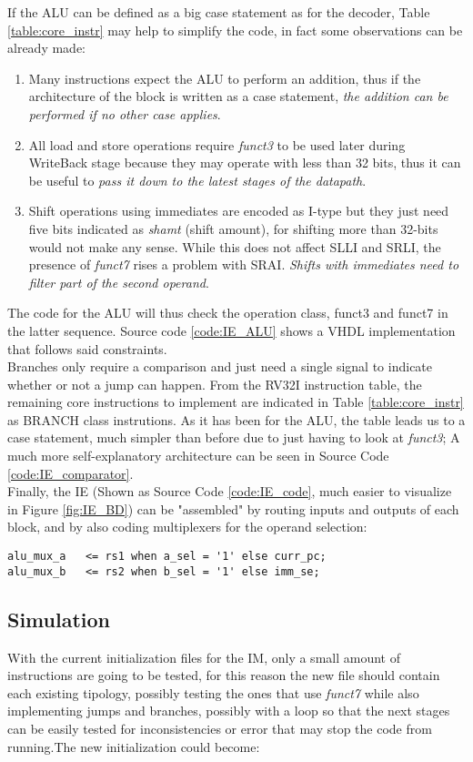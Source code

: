 If the ALU can be defined as a big case statement as for the decoder, Table \ref{table:core_instr} may help to simplify the code, in fact some observations can be already made:
\begin{enumerate}
\item Many instructions expect the ALU to perform an addition, thus if the architecture of the block is written as a case statement, \emph{the addition can be performed if no other case applies}.
\item All load and store operations require \emph{funct3} to be used later during WriteBack stage because they may operate with less than 32 bits, thus it can be useful to \emph{pass it down to the latest stages of the datapath}.
\item Shift operations using immediates are encoded as I-type but they just need five bits indicated as \emph{shamt} (shift amount), for shifting more than 32-bits would not make any sense. While this does not affect SLLI and SRLI, the presence of \emph{funct7} rises a problem with SRAI. \emph{Shifts with immediates need to filter part of the second operand}.
\end{enumerate}
The code for the ALU will thus check the operation class, funct3 and funct7 in the latter sequence. Source code \ref{code:IE_ALU} shows a VHDL implementation that follows said constraints.\\
Branches only require a comparison and just need a single signal to indicate whether or not a jump can happen. From the RV32I instruction table, the remaining core instructions  to implement are indicated in Table \ref{table:core_instr} as BRANCH class instrutions. As it has been for the ALU, the table leads us to a case statement, much simpler than before due to just having to look at \emph{funct3}; A much more self-explanatory architecture can be seen in Source Code \ref{code:IE_comparator}.\\
Finally, the IE (Shown as Source Code \ref{code:IE_code}, much easier to visualize in Figure \ref{fig:IE_BD}) can be "assembled" by routing inputs and outputs of each block, and by also coding multiplexers for the operand selection:

\begin{verbatim}
alu_mux_a   <= rs1 when a_sel = '1' else curr_pc;
alu_mux_b   <= rs2 when b_sel = '1' else imm_se;
\end{verbatim}

\subsection{Simulation}
With the current initialization files for the IM, only a small amount of instructions are going to be tested, for this reason the new file should contain each existing tipology, possibly testing the ones that use \emph{funct7} while also implementing jumps and branches, possibly with a loop so that the next stages can be easily tested for inconsistencies or error that may stop the code from running.The new initialization could become:

